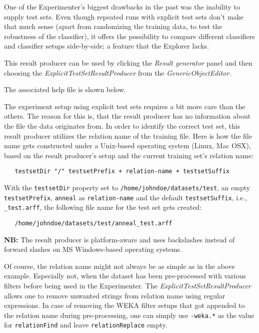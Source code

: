 One of the Experimenter's biggest drawbacks in the past was the inability to supply test sets. Even though repeated runs with explicit test sets don't make that much sense (apart from randomizing the training data, to test the robustness of the classifier), it offers the possibility to compare different classifiers and classifier setups side-by-side; a feature that the Explorer lacks.

This result producer can be used by clicking the \textit{Result generator} panel and then choosing the \textit{ExplicitTestSetResultProducer} from the \textit{GenericObjectEditor}.
\begin{center}
\end{center}

The associated help file is shown below.
\begin{center}
\end{center}

The experiment setup using explicit test sets requires a bit more care than the others. The reason for this is, that the result producer has no information about the file the data originates from. In order to identify the correct test set, this result producer utilizes the relation name of the training file. Here is how the file name gets constructed under a Unix-based operating system (Linux, Mac OSX), based on the result producer's setup and the current training set's relation name:
\begin{verbatim}
   testsetDir "/" testsetPrefix + relation-name + testsetSuffix
\end{verbatim}

\noindent With the \texttt{testsetDir} property set to \texttt{/home/johndoe/datasets/test}, an empty \texttt{testsetPrefix}, \texttt{anneal} as \texttt{relation-name} and the default \texttt{testsetSuffix}, i.e., \texttt{\_test.arff}, the following file name for the test set gets created:
\begin{verbatim}
   /home/johndoe/datasets/test/anneal_test.arff
\end{verbatim}

\noindent \textbf{NB:} The result producer is platform-aware and uses backslashes instead of forward slashes on MS Windows-based operating systems.

Of course, the relation name might not always be as simple as in the above example. Especially not, when the dataset has been pre-processed with various filters before being used in the Experimenter. The \textit{ExplicitTestSetResultProducer} allows one to remove unwanted strings from relation name using regular expressions. In case of removing the WEKA filter setups that got appended to the relation name during pre-processing, one can simply use \texttt{-weka.*} as the value for \texttt{relationFind} and leave \texttt{relationReplace} empty.

